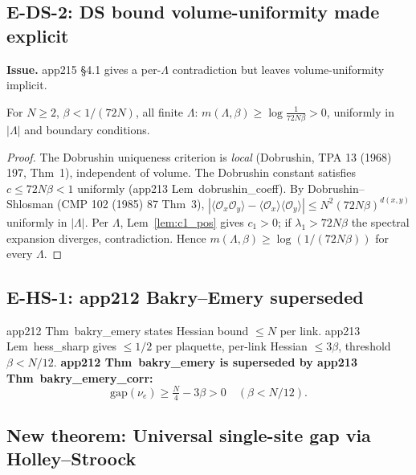 \subsection{E-DS-2: DS bound volume-uniformity made explicit}
\label{ssec:eds2}

\textbf{Issue.}
app215 \S4.1 gives a per-$\Lambda$ contradiction but leaves volume-uniformity implicit.

\begin{lemma}
\label{lem:ds_uniform}
For $N\ge 2$, $\beta<1/(72N)$, all finite $\Lambda$:
$m(\Lambda,\beta)\ge\log\frac{1}{72N\beta}>0$,
uniformly in $|\Lambda|$ and boundary conditions.
\end{lemma}
\begin{proof}
The Dobrushin uniqueness criterion is \emph{local}
(Dobrushin, TPA 13 (1968) 197, Thm~1), independent of volume.
The Dobrushin constant satisfies $c\le 72N\beta<1$ uniformly (app213 Lem~dobrushin\_coeff).
By Dobrushin--Shlosman (CMP 102 (1985) 87 Thm~3),
$|\langle\mathcal{O}_x\mathcal{O}_y\rangle-\langle\mathcal{O}_x\rangle\langle\mathcal{O}_y\rangle|
\le N^2(72N\beta)^{d(x,y)}$ uniformly in $|\Lambda|$.
Per $\Lambda$, Lem~\ref{lem:c1_pos} gives $c_1>0$;
if $\lambda_1>72N\beta$ the spectral expansion diverges, contradiction.
Hence $m(\Lambda,\beta)\ge\log(1/(72N\beta))$ for every $\Lambda$.
\end{proof}

\subsection{E-HS-1: app212 Bakry--Emery superseded}
\label{ssec:ehs1}

app212 Thm~bakry\_emery states Hessian bound $\le N$ per link.
app213 Lem~hess\_sharp gives $\le 1/2$ per plaquette,
per-link Hessian $\le 3\beta$, threshold $\beta<N/12$.
\textbf{app212 Thm~bakry\_emery is superseded by app213 Thm~bakry\_emery\_corr:}
\begin{equation}
  \mathrm{gap}(\nu_e)\ge\tfrac{N}{4}-3\beta>0\quad(\beta<N/12).
\end{equation}

\subsection{New theorem: Universal single-site gap via Holley--Stroock}
\label{ssec:hs_new}

